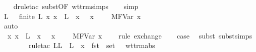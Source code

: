 \begin{isabellebody}
\ \ \isamarkupfalse%
\ {\isacharparenleft}drule{\isacharunderscore}tac\ subst{\isacharbrackleft}OF\ wt{\isacharunderscore}trm{\isachardot}simps{\isacharbrackright}{\isacharparenright}\isanewline
\ \ \isamarkupfalse%
\ simp\isanewline
\ \ \isamarkupfalse%
\ \isamarkupfalse%
\ L{\isacharprime}\ \ {}{\isacharcolon}\ {\isachardoublequoteopen}finite\ L{\isacharprime}{\isachardoublequoteclose}\ {\isachardoublequoteopen}{\isasymAnd}x{\isacharprime}{\isachardot}\ x{\isacharprime}\ {\isasymnotin}\ L{\isacharprime}\ {\isasymLongrightarrow}\ {\isacharparenleft}x{\isacharprime}{\isacharcomma}\ {\isasympi}{\isacharparenright}\ {\isacharhash}\ {\isacharparenleft}x{\isacharcomma}\ {\isasymtau}{\isacharparenright}\ {\isacharhash}\ {\isasymGamma}\ {\isasymturnstile}\ M{\isacharcircum}FVar\ x{\isacharprime}\ {\isacharcolon}\ {\isasymdelta}{\isachardoublequoteclose}\ \isamarkupfalse%
\ auto\ \ \ \ \ \ \ \ \ \ \ \ \ \ \ \ \ \ \ \ \ \ \ \ \ \ \ \ \ \ \ \ \ \ \ \ \ \ \ \ \ \ \ \ \ \ \ \ \ \ \ \ \ \ \ \ \ \isanewline
\ \ \isamarkupfalse%
\ {}{\isacharparenleft}{}{\isacharparenright}\ \isamarkupfalse%
\ {}{\isacharcolon}\ {\isachardoublequoteopen}{\isasymAnd}x{\isacharprime}{\isachardot}\ x{\isacharprime}\ {\isasymnotin}\ L{\isacharprime}\ {\isasymLongrightarrow}\ {\isacharparenleft}x{\isacharcomma}\ {\isasymtau}{\isacharparenright}\ {\isacharhash}\ {\isacharparenleft}x{\isacharprime}{\isacharcomma}\ {\isasympi}{\isacharparenright}\ {\isacharhash}\ {\isasymGamma}\ {\isasymturnstile}\ M{\isacharcircum}FVar\ x{\isacharprime}\ {\isacharcolon}\ {\isasymdelta}{\isachardoublequoteclose}\ \isamarkupfalse%
\ {\isacharparenleft}rule\ exchange{\isacharparenright}\isanewline
\isanewline
\ \ \isamarkupfalse%
\ {\isacharquery}case\ \isamarkupfalse%
\ {\isacharparenleft}subst\ subst{\isachardot}simps{\isacharparenright}\isanewline
\ \ \isamarkupfalse%
\ {}{\isacharparenleft}{}{\isacharparenright}\isanewline
\ \ \isamarkupfalse%
\ {\isacharparenleft}rule{\isacharunderscore}tac\ L{\isacharequal}{\isachardoublequoteopen}L\ {\isasymunion}\ L{\isacharprime}\ {\isasymunion}\ {\isacharbraceleft}x{\isacharbraceright}\ {\isasymunion}\ fst\ {\isacharbackquote}\ set\ {\isasymGamma}{\isachardoublequoteclose}\ \ wt{\isacharunderscore}trm{\isachardot}abs{\isacharparenright}\isanewline
\ \ \isamarkupfalse%

\end{isabellebody}
